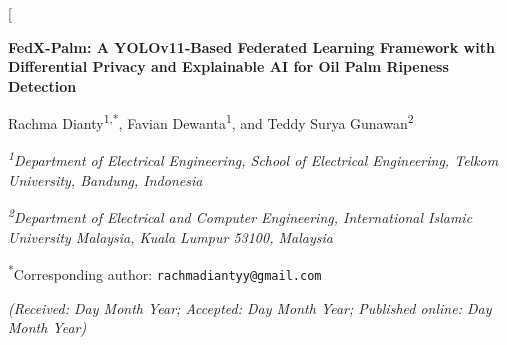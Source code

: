 \documentclass[twocolumn,a4paper,10pt]{article}
\begin{document}
\twocolumn[
\begin{@twocolumnfalse}
\begin{center}
{\Large\bfseries FedX-Palm: A YOLOv11-Based Federated Learning Framework with
Differential Privacy and Explainable AI for Oil Palm Ripeness Detection\par}
\vspace{1em}
{\large Rachma Dianty\textsuperscript{1,*}, Favian Dewanta\textsuperscript{1},
and Teddy Surya Gunawan\textsuperscript{2}\par}
\vspace{0.8em}
{\small\itshape \textsuperscript{1}Department of Electrical Engineering, School
of Electrical Engineering, Telkom University, Bandung, Indonesia\par}
{\small\itshape \textsuperscript{2}Department of Electrical and Computer
Engineering, International Islamic University Malaysia, Kuala Lumpur 53100,
Malaysia\par}
\vspace{0.5em}
{\small\textsuperscript{*}Corresponding author:
\texttt{rachmadiantyy@gmail.com}\par}
\vspace{0.3em}
{\small\itshape (Received: Day Month Year; Accepted: Day Month Year;
Published online: Day Month Year)\par}
\end{center}
\vspace{0.5em}


\end{@twocolumnfalse}
\end{document}
